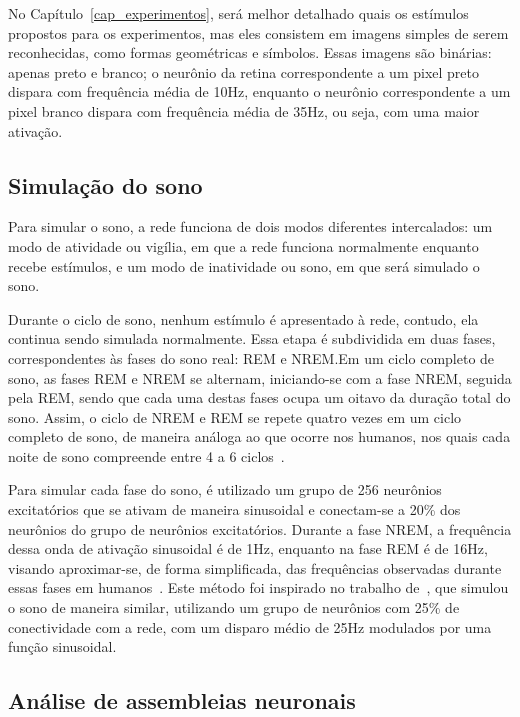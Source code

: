 No Capítulo~\ref{cap_experimentos}, será melhor detalhado quais os estímulos propostos para os experimentos, mas eles consistem em
imagens simples de serem reconhecidas, como formas geométricas e símbolos. Essas imagens são binárias: apenas preto e branco; o
neurônio da retina correspondente a um pixel preto dispara com frequência média de 10Hz, enquanto o neurônio correspondente a um
pixel branco dispara com frequência média de 35Hz, ou seja, com uma maior ativação.

\subsection{Simulação do sono}\label{subsection_sono}

Para simular o sono, a rede funciona de dois modos diferentes intercalados: um modo de atividade ou vigília, em que a rede
funciona normalmente enquanto recebe estímulos, e um modo de inatividade ou sono, em que será simulado o sono. 

Durante o ciclo de sono, nenhum estímulo é apresentado à rede, contudo, ela continua sendo simulada normalmente. Essa etapa é
subdividida em duas fases, correspondentes às fases do sono real: REM e NREM.\@ Em um ciclo completo de sono, as fases REM e NREM
se alternam, iniciando-se com a fase NREM, seguida pela REM, sendo que cada uma destas fases ocupa um oitavo da duração total do
sono. Assim, o ciclo de NREM e REM se repete quatro vezes em um ciclo completo de sono, de maneira análoga ao que ocorre nos
humanos, nos quais cada noite de sono compreende entre 4 a 6 ciclos~\cite{patelPhysiology2023}.

Para simular cada fase do sono, é utilizado um grupo de 256 neurônios excitatórios que se ativam de maneira sinusoidal e
conectam-se a 20\% dos neurônios do grupo de neurônios excitatórios. Durante a fase NREM, a frequência dessa onda de ativação
sinusoidal é de 1Hz, enquanto na fase REM é de 16Hz, visando aproximar-se, de forma simplificada, das frequências observadas
durante essas fases em humanos~\cite{guoSlow2022, cowdinTheta2014}. Este método foi inspirado no trabalho de~, que
simulou o sono de maneira similar, utilizando um grupo de neurônios com 25\% de conectividade com a rede, com um disparo médio de
25Hz modulados por uma função sinusoidal.

\subsection{Análise de assembleias neuronais}

